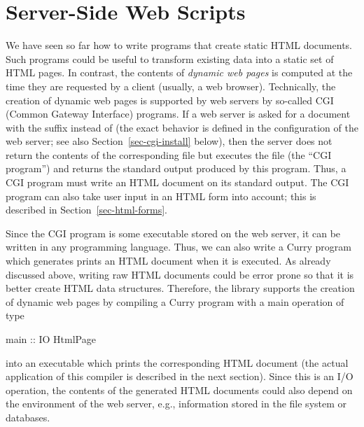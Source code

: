 \section{Server-Side Web Scripts}

We have seen so far how to write programs that create
static HTML documents.
Such programs could be useful to transform existing data into a static
set of HTML pages.
In contrast, the contents of \emph{dynamic web pages}
is computed at the time they are requested by a client
(usually, a web browser).
Technically, the creation of dynamic web pages is supported by web servers
by so-called CGI (Common Gateway Interface) programs.
If a web server is asked for a document with the suffix 
instead of  (the exact behavior is defined in the configuration
of the web server; see also Section~\ref{sec-cgi-install} below),
then the server does not return
the contents of the corresponding file but executes the file
(the ``CGI program'') and returns the standard output produced
by this program. Thus, a CGI program must write an HTML document
on its standard output. The CGI program can also take user input
in an HTML form into account; this is described in
Section~\ref{sec-html-forms}.

Since the CGI program is some executable stored on the web server,
it can be written in any programming language.
Thus, we can also write a Curry program which generates
prints an HTML document when it is executed.
As already discussed above, writing raw HTML documents
could be error prone so that it is better create HTML data structures.
Therefore, the library 
supports the creation of dynamic web pages by compiling
a Curry program with a main operation of type
\begin{curry}
main :: IO HtmlPage
\end{curry}
into an executable which prints the corresponding HTML document
(the actual application of this compiler is described in the next section).
Since this is an I/O operation,
the contents of the generated HTML documents could also depend on the
environment of the web server, e.g., information stored in the
file system or databases.

